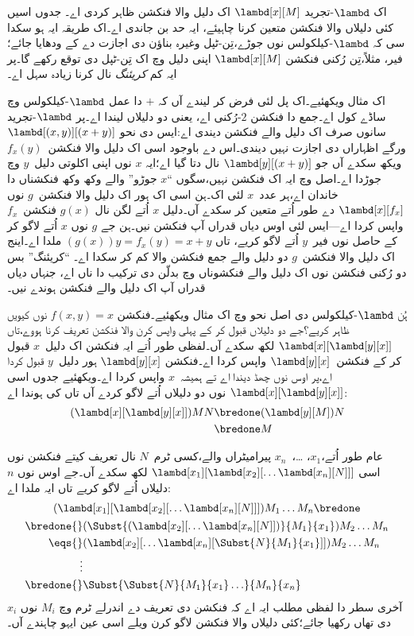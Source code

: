 \documentclass[../../../include/open-logic-section]{subfiles}
\begin{document}

اک $\lambd$-تجرید $\lambd[x][M]$ اک دلیل والا فنکشن ظاہر کردی اے۔ جدوں
اسیں کئی دلیلاں والا فنکشن متعین کرنا چاہیئے، ایہ حد بن جاندی اے۔اک طریقہ ایہ ہو سکدا سی کہ $\lambd$-کیلکولس
نوں جوڑے،تِن-ٹپل وغیرہ بناؤن دی اجازت دے کے ودھایا جائے؛فیر،
مثلاً،تِن رُکنی فنکشن $\lambd[x][M]$ اپنی دلیل وچ اک
تِن-ٹپل دی توقع رکھے گا۔پر ایہ کم \emph{کریئنگ} نال کرنا
زیادہ سہل اے۔

اک مثال ویکھئیے۔اک پل لئی فرض کر لیندے آں کہ $+$ دا عمل
$\lambd$-کیلکولس وچ ساڈے کول اے۔جمع دا فنکشن $2$-رُکنی اے،
یعنی دو دلیلاں لیندا اے۔پر $\lambd$-تجرید سانوں صرف اک
دلیل والے فنکشن دیندی اے:ایس دی نحو
$\lambd[(x,y)][(x+y)]$ ورگے اظہاراں دی اجازت نہیں دیندی۔اس
دے باوجود اسی اک دلیل والا فنکشن~$f_x(y)$ ویکھ سکدے آں جو
$\lambd[y][(x+y)]$ نال دتا گیا اے؛ایہ $x$ نوں اپنی اکلوتی
دلیل~$y$ وچ جوڑدا اے۔اصل وچ ایہ اک فنکشن نہیں،سگوں ``$x$ جوڑو''
والے وکھ وکھ فنکشناں دا خاندان اے،ہر عدد~$x$ لئی اک۔ہن اسی
اک ہور اک دلیل والا فنکشن~$g$ نوں $\lambd[x][f_x]$ دے طور اُتے
متعین کر سکدے آں۔دلیل $x$ اُتے لگن نال $g(x)$ فنکشن~$f_x$
واپس کردا اے—ایس لئی اوس دیاں قدراں آپ فنکشن نیں۔ہن جے
$g$ نوں $x$ اُتے لاگو کر کے حاصل نوں فیر~$y$ اُتے لاگو کریے،
تاں $(g(x))y = f_x(y) = x+y$ ملدا اے۔اینج اک دلیل والا
فنکشن~$g$ دو دلیل والے جمع فنکشن والا کم کر سکدا اے۔
``کریئنگ'' بس دو رُکنی فنکشن نوں اک دلیل والے فنکشوناں وچ بدلّن دی ترکیب دا ناں اے،
جنہاں دیاں قدراں آپ اک دلیل والے فنکشن ہوندے نیں۔

ہُن $\lambd$-کیلکولس دی اصل نحو وچ اک مثال ویکھئیے۔فنکشن
$f(x,y) = x$ نوں کیویں ظاہر کریے؟جے دو دلیلاں قبول کر کے پہلی
واپس کرن والا فنکشن تعریف کرنا ہووے،تاں
$\lambd[x][\lambd[y][x]]$ لکھ سکدے آں۔لفظی طور اُتے ایہ
فنکشن اک دلیل~$x$ قبول کر کے فنکشن~$\lambd[y][x]$ واپس کردا
اے۔فنکشن $\lambd[y][x]$ ہور دلیل~$y$ قبول کردا اے،پر اوس نوں
چھڈ دیندا اے تے ہمیشہ~$x$ واپس کردا اے۔ویکھئیے جدوں اسی
$\lambd[x][\lambd[y][x]]$ نوں دو دلیلاں اُتے لاگو کردے آں
تاں کی ہوندا اے:
\begin{align*}
  (\lambd[x][\lambd[y][x]])MN 
  \bredone & (\lambd[y][M])N \\
  \bredone & M
\end{align*}

عام طور اُتے،$x_1$، \dots،~$x_n$ پیرامیٹراں والے،کسی
ٹرم~$N$ نال تعریف کیتے فنکشن نوں اسی
$\lambd[x_1][\lambd[x_2][\ldots\lambd[x_n][N]]]$ لکھ سکدے
آں۔جے اوس نوں $n$ دلیلاں اُتے لاگو کریے تاں ایہ ملدا اے:
\begin{multline*}
  (\lambd[x_1][\lambd[x_2][\ldots\lambd[x_n][N]]]) M_1 \dots M_n \bredone\\
  \begin{aligned}
  \bredone {} & (\Subst{(\lambd[x_2][\ldots\lambd[x_n][N]])}{M_1}{x_1}) M_2
  \dots M_n\\
   \eqs {} & (\lambd[x_2][\ldots\lambd[x_n][\Subst{N}{M_1}{x_1}]]) M_2
            \dots M_n \\
  \vdots & \\
  \bredone {} &\Subst{\Subst{N}{M_1}{x_1}\ldots}{M_n}{x_n}
  \end{aligned}
\end{multline*}
آخری سطر دا لفظی مطلب ایہ اے کہ فنکشن دی تعریف دے اندرلے ٹرم وچ
$M_i$ نوں $x_i$ دی تھاں رکھیا جائے؛کئی دلیلاں والا فنکشن
لاگو کرن ویلے اسی عین ایہو چاہندے آں۔
\end{document}
